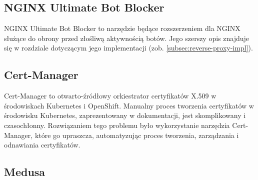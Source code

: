 \subsection{NGINX Ultimate Bot Blocker}\label{subsec:nginx-ultimate-bot-blocker-tools}

NGINX Ultimate Bot Blocker to narzędzie będące rozszerzeniem dla NGINX służące do obrony przed złośliwą aktywnością botów.
Jego szerszy opis znajduje się w rozdziale dotyczącym jego implementacji (zob. \autoref{subsec:reverse-proxy-impl}).

\subsection{Cert-Manager}\label{subsec:cert-manager}

Cert-Manager to otwarto-źródłowy orkiestrator certyfikatów X.509 w środowiskach Kubernetes i OpenShift\cite{cert-manager-home}.
Manualny proces tworzenia certyfikatów w środowisku Kubernetes, zaprezentowany w dokumentacji\cite{kubernetes-generate-certificates-manually}, jest skomplikowany i czasochłonny.
Rozwiązaniem tego problemu było wykorzystanie narzędzia Cert-Manager, które go upraszcza, automatyzując proces tworzenia, zarządzania i odnawiania certyfikatów.

%

%
%
%

\subsection{Medusa}\label{subsec:medusa}

